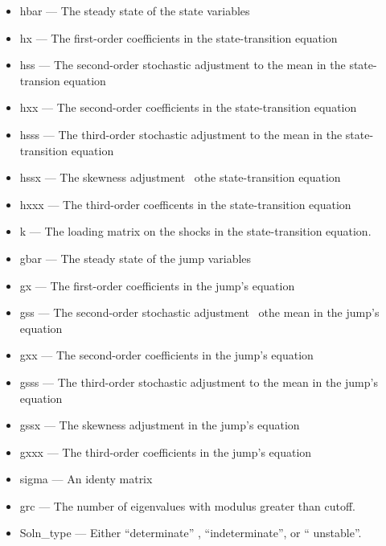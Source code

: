 \documentclass[notitlepage,11pt]{article}
\begin{document}
\begin{itemize}
\item hbar --- The steady state of the state variables

\item hx --- The first-order coefficients in the state-transition equation

\item hss --- The second-order stochastic adjustment to the mean in the
state-transion equation

\item hxx --- The second-order coefficients in the state-transition equation

\item hsss --- The third-order stochastic adjustment to the mean in the
state-transition equation

\item hssx --- The skewness adjustment \ othe state-transition equation

\item hxxx --- The third-order coefficents in the state-transition equation

\item k --- The loading matrix on the shocks in the state-transition
equation.

\item gbar --- The steady state of the jump variables

\item gx --- The first-order coefficients in the jump's equation

\item gss --- The second-order stochastic adjustment \ othe mean in the
jump's equation

\item gxx --- The second-order coefficients in the jump's equation

\item gsss --- The third-order stochastic adjustment to the mean in the
jump's equation

\item gssx --- The skewness adjustment in the jump's equation

\item gxxx --- The third-order coefficients in the jump's equation

\item sigma --- An identy matrix

\item grc --- The number of eigenvalues with modulus greater than cutoff.

\item Soln\_type --- Either \textquotedblleft determinate\textquotedblright
, \textquotedblleft indeterminate\textquotedblright , or \textquotedblleft
unstable\textquotedblright .
\end{itemize}
\end{document}
